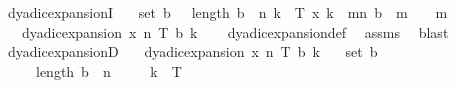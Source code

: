 \begin{isabellebody}
{}%
\isamarkupfalse%
\ dyadic{\isacharunderscore}{\kern0pt}expansionI{\isacharcolon}{\kern0pt}\isanewline
\ \ \ {\isachardoublequoteopen}set\ b\ {\isasymsubseteq}\ {\isacharbraceleft}{\kern0pt}{}{\isacharcomma}{\kern0pt}{}{\isacharbraceright}{\kern0pt}{\isachardoublequoteclose}\ {\isachardoublequoteopen}length\ b\ {\isacharequal}{\kern0pt}\ n{\isachardoublequoteclose}\ {\isachardoublequoteopen}k\ {\isasymin}\ {\isacharbraceleft}{\kern0pt}{}{\isachardot}{\kern0pt}{\isachardot}{\kern0pt}{\isasymlfloor}T{\isasymrfloor}{\isacharbraceright}{\kern0pt}{\isachardoublequoteclose}\ {\isachardoublequoteopen}x{\isacharequal}{\kern0pt}\ k\ {\isacharplus}{\kern0pt}\ {\isacharparenleft}{\kern0pt}{\isasymSum}m{\isasymin}{\isacharbraceleft}{\kern0pt}{}{\isachardot}{\kern0pt}{\isachardot}{\kern0pt}n{\isacharbraceright}{\kern0pt}{\isachardot}{\kern0pt}\ {\isacharparenleft}{\kern0pt}b\ {\isacharbang}{\kern0pt}\ {\isacharparenleft}{\kern0pt}m{\isacharminus}{\kern0pt}{}{\isacharparenright}{\kern0pt}{\isacharparenright}{\kern0pt}\ {\isacharslash}{\kern0pt}\ {}\ {\isacharcircum}{\kern0pt}\ m{\isacharparenright}{\kern0pt}{\isachardoublequoteclose}\isanewline
\ \ \ {\isachardoublequoteopen}dyadic{\isacharunderscore}{\kern0pt}expansion\ x\ n\ T\ b\ k{\isachardoublequoteclose}\isanewline
%
\isadelimproof
\ \ %
\endisadelimproof
%
\isatagproof
{}\isamarkupfalse%
\ dyadic{\isacharunderscore}{\kern0pt}expansion{\isacharunderscore}{\kern0pt}def\ \isamarkupfalse%
\ assms\ \isamarkupfalse%
\ blast%
\endisatagproof
{\isafoldproof}%
%
\isadelimproof
\isanewline
%
\endisadelimproof
\isanewline
{}\isamarkupfalse%
\ dyadic{\isacharunderscore}{\kern0pt}expansionD{\isacharcolon}{\kern0pt}\isanewline
\ \ \ {\isachardoublequoteopen}dyadic{\isacharunderscore}{\kern0pt}expansion\ x\ n\ T\ b\ k{\isachardoublequoteclose}\isanewline
\ \ \ {\isachardoublequoteopen}set\ b\ {\isasymsubseteq}\ {\isacharbraceleft}{\kern0pt}{}{\isacharcomma}{\kern0pt}{}{\isacharbraceright}{\kern0pt}{\isachardoublequoteclose}\isanewline
\ \ \ \ \ {\isachardoublequoteopen}length\ b\ {\isacharequal}{\kern0pt}\ n{\isachardoublequoteclose}\isanewline
\ \ \ \ \ {\isachardoublequoteopen}k\ {\isasymin}\ {\isacharbraceleft}{\kern0pt}{}{\isachardot}{\kern0pt}{\isachardot}{\kern0pt}{\isasymlfloor}T{\isasymrfloor}{\isacharbraceright}{\kern0pt}{\isachardoublequoteclose}\isanewline

\end{isabellebody}
